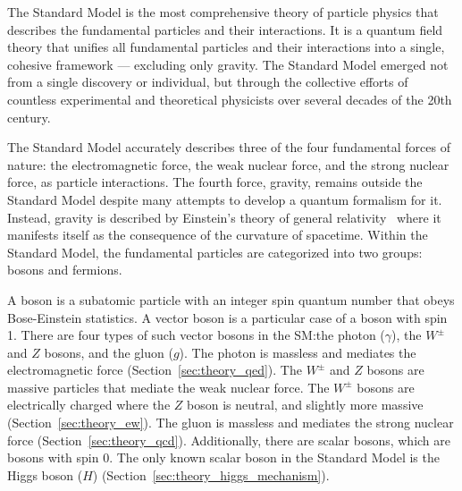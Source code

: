 The Standard Model is the most comprehensive theory of particle physics that describes the fundamental particles and their interactions. It is a quantum field theory that unifies all fundamental particles and their interactions into a single, cohesive framework --- excluding only gravity. The Standard Model emerged not from a single discovery or individual, but through the collective efforts of countless experimental and theoretical physicists over several decades of the 20th century.

The Standard Model accurately describes three of the four fundamental forces of nature: the electromagnetic force, the weak nuclear force, and the strong nuclear force, as particle interactions. The fourth force, gravity, remains outside the Standard Model despite many attempts to develop a quantum formalism for it. Instead, gravity is described by Einstein's theory of general relativity~\cite{GR_review_article} where it manifests itself as the consequence of the curvature of spacetime. Within the Standard Model, the fundamental particles are categorized into two groups: bosons and fermions.

A boson is a subatomic particle with an integer spin quantum number that obeys Bose-Einstein statistics. A vector boson is a particular case of a boson with spin 1. There are four types of such vector bosons in the SM:\@ the photon ($\gamma$), the $W^{\pm}$ and $Z$ bosons, and the gluon ($g$). The photon is massless and mediates the electromagnetic force (Section~\ref{sec:theory_qed}). The $W^{\pm}$ and $Z$ bosons are massive particles that mediate the weak nuclear force. The $W^\pm$ bosons are electrically charged where the $Z$ boson is neutral, and slightly more massive (Section~\ref{sec:theory_ew}). The gluon is massless and mediates the strong nuclear force (Section~\ref{sec:theory_qcd}). Additionally, there are scalar bosons, which are bosons with spin 0. The only known scalar boson in the Standard Model is the Higgs boson ($H$) (Section~\ref{sec:theory_higgs_mechanism}).

